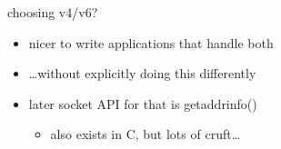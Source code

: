 \begin{frame}{choosing v4/v6?}
    \begin{itemize}
    \item nicer to write applications that handle both
    \item \ldots without explicitly doing this differently
    \vspace{.5cm}
    \item later socket API for that is getaddrinfo()
        \begin{itemize}
        \item also exists in C, but lots of cruft\ldots
        \end{itemize}
    \end{itemize}
\end{frame}

